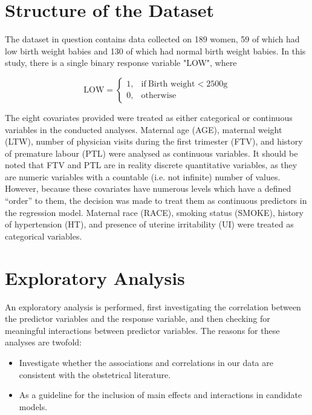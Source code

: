 \section{Structure of the Dataset}
The dataset in question contains data collected on 189 women, 59 of which had low birth weight babies and 130 of which had normal birth weight babies. In this study, there is a single binary response variable "LOW", where

\begin{equation*}
    \text{LOW}=
    \begin{cases}
      1, & \text{if}\ \text{Birth weight} < 2500\text{g} \\
      0, & \text{otherwise}
    \end{cases}
\end{equation*}

 The eight covariates provided were treated as either categorical or continuous variables in the conducted analyses. Maternal age (AGE), maternal weight (LTW), number of physician visits during the first trimester (FTV), and history of premature labour (PTL) were analysed as continuous variables. It should be noted that FTV and PTL are in reality discrete quantitative variables, as they are numeric variables with a countable (i.e. not infinite) number of values. However, because these covariates have numerous levels which have a defined “order” to them, the decision was made to treat them as continuous predictors in the regression model. Maternal race (RACE), smoking status (SMOKE), history of hypertension (HT), and presence of uterine irritability (UI) were treated as categorical variables.

\section{Exploratory Analysis}\label{exploratory}
An exploratory analysis is performed, first investigating the correlation between the predictor variables and the response variable, and then checking for meaningful interactions between predictor variables. The reasons for these analyses are twofold:
\begin{itemize}
    \item Investigate whether the associations and correlations in our data are consistent with the obstetrical literature.
    \item As a guideline for the inclusion of main effects and interactions in candidate models.
\end{itemize}


